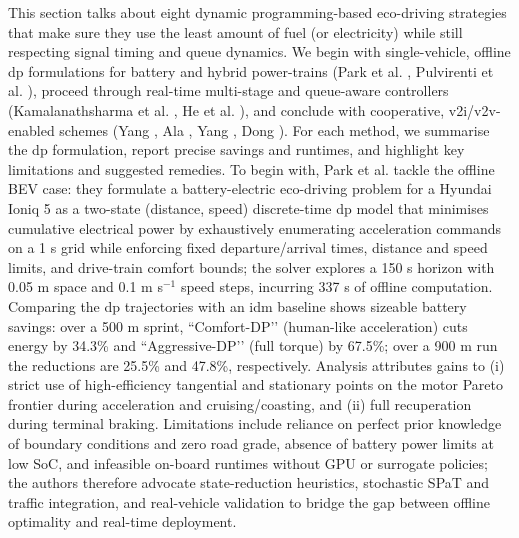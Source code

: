 This section talks about eight dynamic programming-based eco-driving strategies that make sure they use the least amount of fuel (or electricity) while still respecting signal timing and queue dynamics. We begin with single-vehicle, offline \ac{dp} formulations for battery and hybrid power-trains (Park et al. \cite{Park2024}, Pulvirenti et al. \cite{Pulvirenti2023}), proceed through real-time multi-stage and queue-aware controllers (Kamalanathsharma et al. \cite{Kamalanathsharma2013}, He et al. \cite{He2015}), and conclude with cooperative, \ac{v2i}/\ac{v2v}-enabled schemes (Yang \citep{Yang2017}, Ala \citep{Ala2016}, Yang \citep{Yang2021}, Dong \citep{Dong2024}). For each method, we summarise the \ac{dp} formulation, report precise savings and runtimes, and highlight key limitations and suggested remedies.
\mynewline
To begin with, Park et al. \cite{Park2024} tackle the offline BEV case: they formulate a battery-electric eco-driving problem for a Hyundai Ioniq 5 as a two-state (distance, speed) discrete-time \ac{dp} model that minimises cumulative electrical power by exhaustively enumerating acceleration commands on a 1 s grid while enforcing fixed departure/arrival times, distance and speed limits, and drive-train comfort bounds; the solver explores a 150 s horizon with 0.05 m space and 0.1 m s$^{-1}$ speed steps, incurring 337 s of offline computation. Comparing the \ac{dp} trajectories with an \ac{idm} baseline shows sizeable battery savings: over a 500 m sprint, “Comfort-DP’’ (human-like acceleration) cuts energy by 34.3\% and “Aggressive-DP’’ (full torque) by 67.5\%; over a 900 m run the reductions are 25.5\% and 47.8\%, respectively.  Analysis attributes gains to (i) strict use of high-efficiency tangential and stationary points on the motor Pareto frontier during acceleration and cruising/coasting, and (ii) full recuperation during terminal braking. Limitations include reliance on perfect prior knowledge of boundary conditions and zero road grade, absence of battery power limits at low SoC, and infeasible on-board runtimes without GPU or surrogate policies; the authors therefore advocate state-reduction heuristics, stochastic SPaT and traffic integration, and real-vehicle validation to bridge the gap between offline optimality and real-time deployment.
\mynewline
